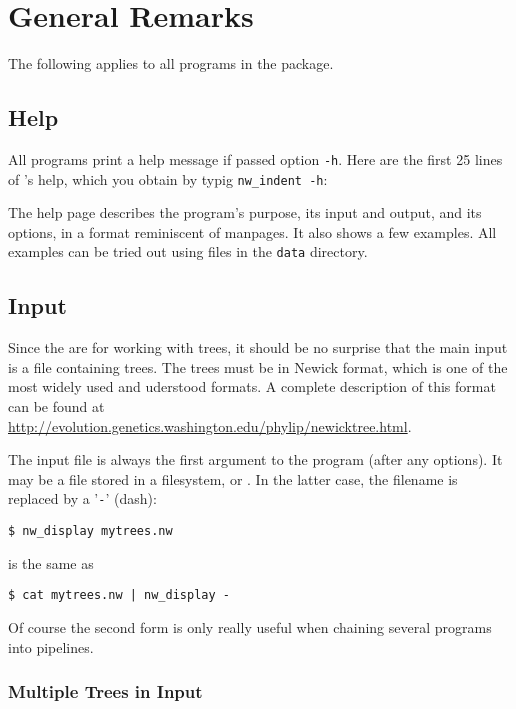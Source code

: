 
\chapter{General Remarks}
\label{chap_general}

The following applies to all programs in the \nutils{} package.

\section{Help}
\label{sct_help}

All programs print a help message if passed option \texttt{-h}. Here are the
first 25 lines of \nwindent{}'s help, which you obtain by typig
\verb+nw_indent -h+:
\begin{samepage}

\end{samepage}
The help page describes the program's purpose, its input and output, and its
options, in a format reminiscent of \unix{} manpages. It also shows a few
examples. All examples can be tried out using files in the \texttt{data}
directory.

\section{Input}
\label{sct_input}

Since the \nutils{} are for working with trees, it should be no surprise
that the main input is a file containing trees. The trees must be in
Newick format, which is one of the most widely used and uderstood formats. A
complete description of this format can be found at
\url{http://evolution.genetics.washington.edu/phylip/newicktree.html}.

The input file is always the first argument to the program (after any options).
It may be a file stored in a filesystem, or \stdin{}. In the latter case, the
filename is replaced by a '\texttt{-}' (dash):
\begin{samepage}
\begin{verbatim}
$ nw_display mytrees.nw
\end{verbatim}
is the same as
\begin{verbatim}
$ cat mytrees.nw | nw_display -
\end{verbatim}
\end{samepage}
Of course the second form is only really useful when chaining several programs into pipelines.

\subsection{Multiple Trees in Input}

